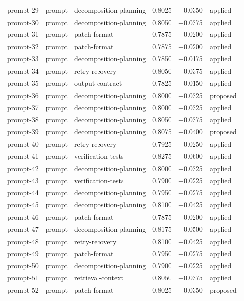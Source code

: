 \begin{center}
\begin{longtable}{llp{5.2cm}rrl}
prompt-29 & prompt & decomposition-planning & 0.8025 & +0.0350 & applied \\
prompt-30 & prompt & decomposition-planning & 0.8050 & +0.0375 & applied \\
prompt-31 & prompt & patch-format & 0.7875 & +0.0200 & applied \\
prompt-32 & prompt & patch-format & 0.7875 & +0.0200 & applied \\
prompt-33 & prompt & decomposition-planning & 0.7850 & +0.0175 & applied \\
prompt-34 & prompt & retry-recovery & 0.8050 & +0.0375 & applied \\
prompt-35 & prompt & output-contract & 0.7825 & +0.0150 & applied \\
prompt-36 & prompt & decomposition-planning & 0.8000 & +0.0325 & proposed \\
prompt-37 & prompt & decomposition-planning & 0.8000 & +0.0325 & applied \\
prompt-38 & prompt & decomposition-planning & 0.8050 & +0.0375 & applied \\
prompt-39 & prompt & decomposition-planning & 0.8075 & +0.0400 & proposed \\
prompt-40 & prompt & retry-recovery & 0.7925 & +0.0250 & applied \\
prompt-41 & prompt & verification-tests & 0.8275 & +0.0600 & applied \\
prompt-42 & prompt & decomposition-planning & 0.8000 & +0.0325 & applied \\
prompt-43 & prompt & verification-tests & 0.7900 & +0.0225 & applied \\
prompt-44 & prompt & decomposition-planning & 0.7950 & +0.0275 & applied \\
prompt-45 & prompt & decomposition-planning & 0.8100 & +0.0425 & applied \\
prompt-46 & prompt & patch-format & 0.7875 & +0.0200 & applied \\
prompt-47 & prompt & decomposition-planning & 0.8175 & +0.0500 & applied \\
prompt-48 & prompt & retry-recovery & 0.8100 & +0.0425 & applied \\
prompt-49 & prompt & patch-format & 0.7950 & +0.0275 & applied \\
prompt-50 & prompt & decomposition-planning & 0.7900 & +0.0225 & applied \\
prompt-51 & prompt & retrieval-context & 0.8050 & +0.0375 & applied \\
prompt-52 & prompt & patch-format & 0.8025 & +0.0350 & proposed \\

\end{longtable}
\end{center}
